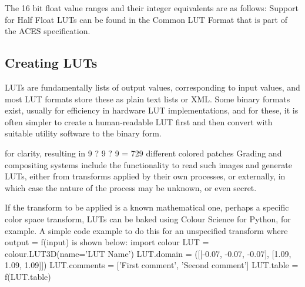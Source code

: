 The 16 bit float value ranges and their integer equivalents are as follows:
Support for Half Float LUTs can be found in the Common LUT Format that is part of the ACES specification.

\subsection{Creating LUTs}%
\label{subsec:creating-luts}

LUTs are fundamentally lists of output values, corresponding to input values, and most LUT formats store these as plain text lists or XML. Some binary formats exist, usually for efficiency in hardware LUT implementations, and for these, it is often simpler to create a human-readable LUT first and then convert with suitable utility software to the binary form.

for clarity, resulting in 9 ? 9 ? 9 = 729 different colored patches
Grading and compositing systems include the functionality to read such images and generate LUTs, either from transforms applied by their own processes, or externally, in which case the nature of the process may be unknown, or even secret.

If the transform to be applied is a known mathematical one, perhaps a specific color space transform, LUTs can be baked using Colour Science for Python, for example. A simple code example to do this for an unspecified transform where output = f(input) is shown below:
import colour
LUT = colour.LUT3D(name='LUT Name')
LUT.domain = ([[-0.07, -0.07, -0.07], [1.09, 1.09, 1.09]])
LUT.comments = ['First comment', 'Second comment']
LUT.table = f(LUT.table)

